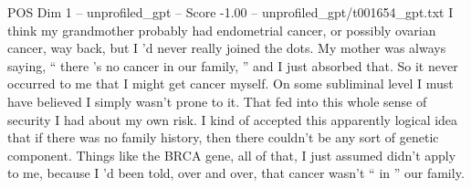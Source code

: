 \begin{textsample}{POS Dim 1 – unprofiled\_gpt – Score -1.00 – unprofiled\_gpt/t001654\_gpt.txt}  \label{ex:f1_pos_028}
I think my grandmother probably had endometrial cancer, or possibly ovarian cancer, way back, but I ’d never really joined the dots.
My mother was always saying, “ there ’s no cancer in our family, ” and I just absorbed that.
So it never occurred to me that I might get cancer myself.
On some subliminal level I must have believed I simply wasn't prone to it.
That fed into this whole sense of security I had about my own risk.
I kind of accepted this apparently logical idea that if there was no family history, then there couldn't be any sort of genetic component.
Things like the BRCA gene, all of that, I just assumed didn't apply to me, because I ’d been told, over and over, that cancer wasn't “ in ” our family.

\end{textsample}
